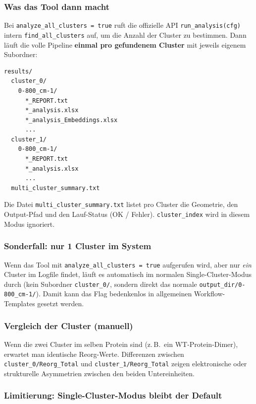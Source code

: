 \documentclass[11pt,a4paper,twoside]{article}
\theoremstyle{remark}
\begin{document}
\subsubsection*{Was das Tool dann macht}

Bei \texttt{analyze\_all\_clusters = true} ruft die offizielle API
\texttt{run\_analysis(cfg)} intern \texttt{find\_all\_clusters} auf, um
die Anzahl der Cluster zu bestimmen. Dann l\"auft die volle Pipeline
\textbf{einmal pro gefundenem Cluster} mit jeweils eigenem Subordner:

\begin{lstlisting}[style=bash]
results/
  cluster_0/
    0-800_cm-1/
      *_REPORT.txt
      *_analysis.xlsx
      *_analysis_Embeddings.xlsx
      ...
  cluster_1/
    0-800_cm-1/
      *_REPORT.txt
      *_analysis.xlsx
      ...
  multi_cluster_summary.txt
\end{lstlisting}

Die Datei \texttt{multi\_cluster\_summary.txt} listet pro Cluster die
Geometrie, den Output-Pfad und den Lauf-Status (OK / Fehler).
\texttt{cluster\_index} wird in diesem Modus ignoriert.

\subsubsection*{Sonderfall: nur 1 Cluster im System}

Wenn das Tool mit \texttt{analyze\_all\_clusters = true} aufgerufen
wird, aber nur \emph{ein} Cluster im Logfile findet, l\"auft es
automatisch im normalen Single-Cluster-Modus durch (kein Subordner
\texttt{cluster\_0/}, sondern direkt das normale
\texttt{output\_dir/0-800\_cm-1/}). Damit kann das Flag bedenkenlos in
allgemeinen Workflow-Templates gesetzt werden.

\subsubsection*{Vergleich der Cluster (manuell)}

Wenn die zwei Cluster im selben Protein sind (z.\,B.\ ein
WT-Protein-Dimer), erwartet man identische Reorg-Werte. Differenzen
zwischen \texttt{cluster\_0/Reorg\_Total} und
\texttt{cluster\_1/Reorg\_Total} zeigen elektronische oder
strukturelle Asymmetrien zwischen den beiden Untereinheiten.

\subsubsection*{Limitierung: Single-Cluster-Modus bleibt der Default}
\end{document}
